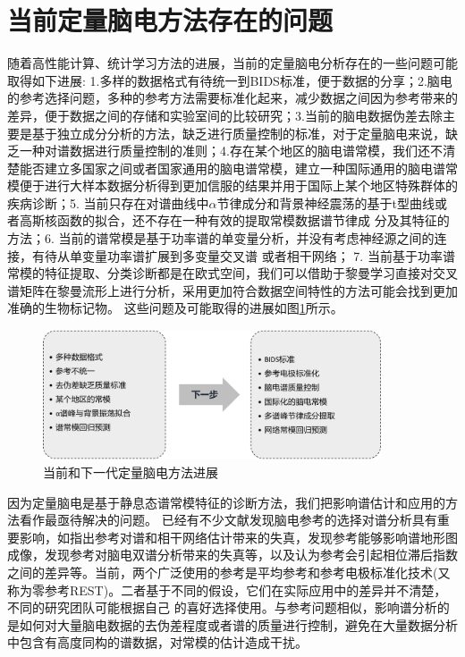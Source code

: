 \section{当前定量脑电方法存在的问题}
随着高性能计算、统计学习方法的进展，当前的定量脑电分析存在的一些问题可能取得如下进展: 1.多样的数据格式有待统一到BIDS标准，便于数据的分享；2.脑电的参考选择问题，多种的参考方法需要标准化起来，减少数据之间因为参考带来的差异，便于数据之间的存储和实验室间的比较研究；3.当前的脑电数据伪差去除主要是基于独立成分分析的方法，缺乏进行质量控制的标准，对于定量脑电来说，缺乏一种对谱数据进行质量控制的准则；4.存在某个地区的脑电谱常模，我们还不清楚能否建立多国家之间或者国家通用的脑电谱常模，建立一种国际通用的脑电谱常模便于进行大样本数据分析得到更加信服的结果并用于国际上某个地区特殊群体的疾病诊断；5. 当前只存在对谱曲线中$\alpha$节律成分和背景神经震荡的基于t型曲线或者高斯核函数的拟合，还不存在一种有效的提取常模数据谱节律成
分及其特征的方法；6. 当前的谱常模是基于功率谱的单变量分析，并没有考虑神经源之间的连接，有待从单变量功率谱扩展到多变量交叉谱
或者相干网络； 7. 当前基于功率谱常模的特征提取、分类诊断都是在欧式空间，我们可以借助于黎曼学习直接对交叉谱矩阵在黎曼流形上进行分析，采用更加符合数据空间特性的方法可能会找到更加准确的生物标记物。 这些问题及可能取得的进展如图\ref{qEEGnext}所示。
\begin{figure}
	\includegraphics[width=10cm]{pic/xulun/qEEGnext.png}
	\caption{当前和下一代定量脑电方法进展}
	\label{qEEGnext}
\end{figure}

因为定量脑电是基于静息态谱常模特征的诊断方法，我们把影响谱估计和应用的方法看作最亟待解决的问题。 已经有不少文献发现脑电参考的选择对谱分析具有重要影响，如\cite{nunez_p_l_eeg_1997}指出参考对谱和相干网络估计带来的失真，\cite{yao_d_comparative_2005}发现参考能够影响谱地形图成像，\cite{chella_f_non-linear_2017}发现参考对脑电双谱分析带来的失真等，以及\cite{thatcher2004eeg}认为参考会引起相位滞后指数之间的差异等。当前，两个广泛使用的参考是平均参考和参考电极标准化技术(又称为零参考REST)。二者基于不同的假设，它们在实际应用中的差异并不清楚，不同的研究团队可能根据自己
的喜好选择使用。与参考问题相似，影响谱分析的是如何对大量脑电数据的去伪差程度或者谱的质量进行控制，避免在大量数据分析中包含有高度同构的谱数据，对常模的估计造成干扰。

